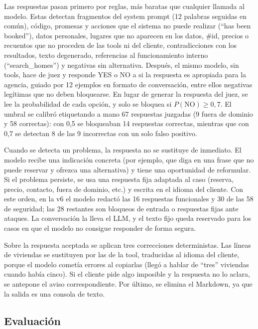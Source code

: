 \documentclass[10pt,a4paper]{article}
\begin{document}
Las respuestas pasan primero por reglas, más baratas que cualquier llamada al modelo. Estas detectan fragmentos del system prompt (12 palabras seguidas en común), código, promesas y acciones que el sistema no puede realizar (``has been booked''), datos personales, lugares que no aparecen en los datos, \#id, precios o recuentos que no proceden de las tools ni del cliente, contradicciones con los resultados, texto degenerado, referencias al funcionamiento interno (``search\_homes'') y negativas sin alternativa. Después, el mismo modelo, sin tools, hace de juez y responde YES o NO a si la respuesta es apropiada para la agencia, guiado por 12 ejemplos en formato de conversación, entre ellos negativas legítimas que no deben bloquearse. En lugar de generar la respuesta del juez, se lee la probabilidad de cada opción, y solo se bloquea si $P(\text{NO}) \geq 0{,}7$. El umbral se calibró etiquetando a mano 67 respuestas juzgadas (9 fuera de dominio y 58 correctas): con 0,5 se bloqueaban 14 respuestas correctas, mientras que con 0,7 se detectan 8 de las 9 incorrectas con un solo falso positivo.

Cuando se detecta un problema, la respuesta no se sustituye de inmediato. El modelo recibe una indicación concreta (por ejemplo, que diga en una frase que no puede reservar y ofrezca una alternativa) y tiene una oportunidad de reformular. Si el problema persiste, se usa una respuesta fija adaptada al caso (reserva, precio, contacto, fuera de dominio, etc.) y escrita en el idioma del cliente. Con este orden, en la v6 el modelo redactó las 16 respuestas funcionales y 30 de las 58 de seguridad; las 28 restantes son bloqueos de entrada o respuestas fijas ante ataques. La conversación la lleva el LLM, y el texto fijo queda reservado para los casos en que el modelo no consigue responder de forma segura.

Sobre la respuesta aceptada se aplican tres correcciones deterministas. Las líneas de viviendas se sustituyen por las de la tool, traducidas al idioma del cliente, porque el modelo cometía errores al copiarlas (llegó a hablar de ``tres'' viviendas cuando había cinco). Si el cliente pide algo imposible y la respuesta no lo aclara, se antepone el aviso correspondiente. Por último, se elimina el Markdown, ya que la salida es una consola de texto.

\subsection{Evaluación}
\label{sec:evaluacion}
\end{document}
